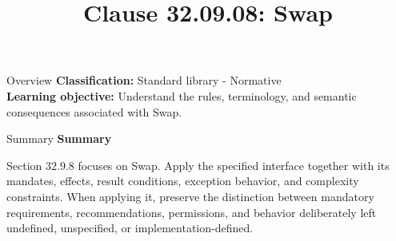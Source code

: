 \documentclass[10pt,letterpaper]{article}
\title{Clause 32.09.08: Swap}
\author{}
\date{}
\begin{document}
\maketitle
\begin{CornellOverviewBox}{Overview}
\textbf{Classification:} Standard library - Normative\\[2pt]
\textbf{Learning objective:} Understand the rules, terminology, and semantic consequences associated with Swap.
\end{CornellOverviewBox}\begin{CornellSummaryBox}{Summary}
{\sffamily\bfseries\color{Accent} Summary}\par\vspace{3pt}Section 32.9.8 focuses on Swap. Apply the specified interface together with its mandates, effects, result conditions, exception behavior, and complexity constraints. When applying it, preserve the distinction between mandatory requirements, recommendations, permissions, and behavior deliberately left undefined, unspecified, or implementation-defined.
\end{CornellSummaryBox}
\end{document}
